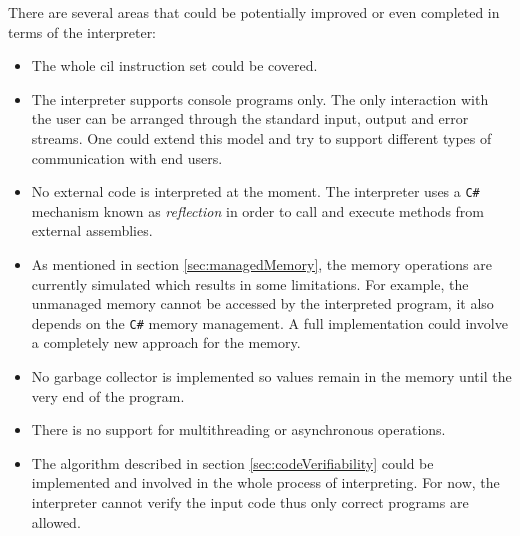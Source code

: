 \documentclass{article}
\numberwithin{equation}{section}
\begin{document}
There are several areas that could be potentially improved or even completed in terms of the interpreter:
\begin{itemize}
	\item{The whole \acrshort{cil} instruction set could be covered.}
	\item{The interpreter supports console programs only. The only interaction with the user can be arranged through the standard input, output and error streams. One could extend this model and try to support different types of communication with end users.}
	\item{No external code is interpreted at the moment. The interpreter uses a \texttt{C\#} mechanism known as \textit{reflection} in order to call and execute methods from external assemblies.}
	\item{As mentioned in section \ref{sec:managedMemory}, the memory operations are currently simulated which results in some limitations. For example, the unmanaged memory cannot be accessed by the interpreted program, it also depends on the \texttt{C\#} memory management. A full implementation could involve a completely new approach for the memory.}
	\item{No garbage collector is implemented so values remain in the memory until the very end of the program.}
	\item{There is no support for multithreading or asynchronous operations.}
	\item{The algorithm described in section \ref{sec:codeVerifiability} could be implemented and involved in the whole process of interpreting. For now, the interpreter cannot verify the input code thus only correct programs are allowed.}
\end{itemize}

\clearpage


\renewcommand{\refname}{Bibliography}

{}


\end{document}

